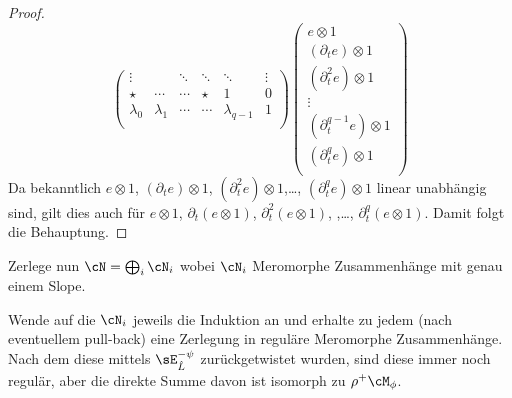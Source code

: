 \begin{proof}
\[\begin{pmatrix}
\vdots    &           & \ddots & \ddots & \ddots        & \vdots\\
\star     & \cdots    & \cdots & \star  & 1             & 0\\
\lambda_0 & \lambda_1 & \cdots & \cdots & \lambda_{q-1} & 1\\
\end{pmatrix}
\begin{pmatrix}
e\otimes 1\\
(\partial_t e)\otimes 1\\
(\partial_t^{2}e)\otimes 1\\
\vdots\\
(\partial_t^{q-1}e)\otimes 1\\
(\partial_t^{q}e)\otimes 1\\
\end{pmatrix}
\]
Da bekanntlich $e\otimes1$, $(\partial_t e)\otimes 1$, $(\partial_t^{2}e)\otimes
1$,\dots, $(\partial_t^{q}e)\otimes 1$ linear unabhängig sind, gilt dies auch
für $e\otimes 1$, $\partial_t(e\otimes 1)$, $\partial_t^2(e\otimes 1)$, ,\dots,
$\partial_t^{q}(e\otimes 1)$. Damit folgt die Behauptung.
\end{proof}
\begin{comment}
\begin{lem}
\cite[Seite 44]{DiplHedwig}
Wenn $\rho^+\cM_\phi=\cD_{\hat K}/\cD_{\hat
K}\cdot(\rho^*P_{\phi}(x,\partial_x))$ gilt, so ist
\begin{align*}
\cN\bydef\rho^+\cM_\phi\otimes\sE_{\hat K}^\psi
  &=\cD_{\hat K}/\cD_{\hat
    K}\cdot(\rho^*P_{\phi}(x,\partial_x+\frac{\beta}{x^{\lambda+1}}))\\
  &=\cD_{\hat K}/\cD_{\hat
    K}\cdot(\rho^*P_{\phi}(x,\partial_x+\frac{\beta}{x^{\lambda+1}}))
\end{align*}
\end{lem}
\end{comment}
Zerlege nun $\cN=\bigoplus_i\cN_i$ wobei $\cN_i$ Meromorphe Zusammenhänge mit
genau einem Slope.
\begin{comment}
TODO: Quelle / Lemma
\end{comment}
Wende auf die $\cN_i$ jeweils die Induktion an und erhalte zu jedem (nach
eventuellem pull-back) eine Zerlegung in reguläre Meromorphe Zusammenhänge.
Nach dem diese mittels $\sE^{-\psi}_{\hat L}$ zurückgetwistet wurden, sind
diese immer noch regulär, aber die direkte Summe davon ist isomorph zu
$\rho^+\cM_{\phi}$.

